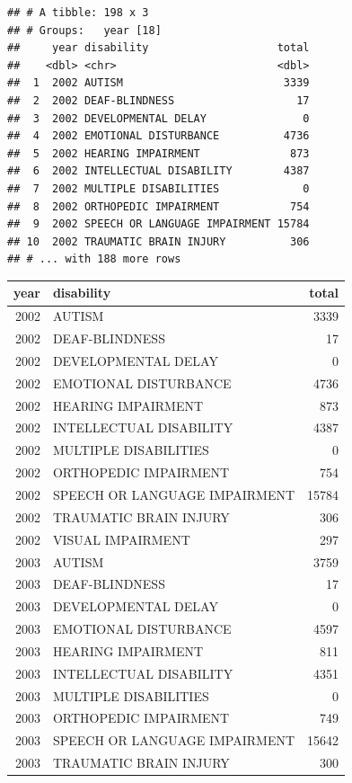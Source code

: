 \documentclass[
  english,
  man]{apa6}
\begin{document}
\begin{verbatim}
## # A tibble: 198 x 3
## # Groups:   year [18]
##     year disability                    total
##    <dbl> <chr>                         <dbl>
##  1  2002 AUTISM                         3339
##  2  2002 DEAF-BLINDNESS                   17
##  3  2002 DEVELOPMENTAL DELAY               0
##  4  2002 EMOTIONAL DISTURBANCE          4736
##  5  2002 HEARING IMPAIRMENT              873
##  6  2002 INTELLECTUAL DISABILITY        4387
##  7  2002 MULTIPLE DISABILITIES             0
##  8  2002 ORTHOPEDIC IMPAIRMENT           754
##  9  2002 SPEECH OR LANGUAGE IMPAIRMENT 15784
## 10  2002 TRAUMATIC BRAIN INJURY          306
## # ... with 188 more rows
\end{verbatim}

\begin{tabular}{r|l|r}
\hline
year & disability & total\\
\hline
2002 & AUTISM & 3339\\
\hline
2002 & DEAF-BLINDNESS & 17\\
\hline
2002 & DEVELOPMENTAL DELAY & 0\\
\hline
2002 & EMOTIONAL DISTURBANCE & 4736\\
\hline
2002 & HEARING IMPAIRMENT & 873\\
\hline
2002 & INTELLECTUAL DISABILITY & 4387\\
\hline
2002 & MULTIPLE DISABILITIES & 0\\
\hline
2002 & ORTHOPEDIC IMPAIRMENT & 754\\
\hline
2002 & SPEECH OR LANGUAGE IMPAIRMENT & 15784\\
\hline
2002 & TRAUMATIC BRAIN INJURY & 306\\
\hline
2002 & VISUAL IMPAIRMENT & 297\\
\hline
2003 & AUTISM & 3759\\
\hline
2003 & DEAF-BLINDNESS & 17\\
\hline
2003 & DEVELOPMENTAL DELAY & 0\\
\hline
2003 & EMOTIONAL DISTURBANCE & 4597\\
\hline
2003 & HEARING IMPAIRMENT & 811\\
\hline
2003 & INTELLECTUAL DISABILITY & 4351\\
\hline
2003 & MULTIPLE DISABILITIES & 0\\
\hline
2003 & ORTHOPEDIC IMPAIRMENT & 749\\
\hline
2003 & SPEECH OR LANGUAGE IMPAIRMENT & 15642\\
\hline
2003 & TRAUMATIC BRAIN INJURY & 300\\

\end{tabular}
\end{document}
